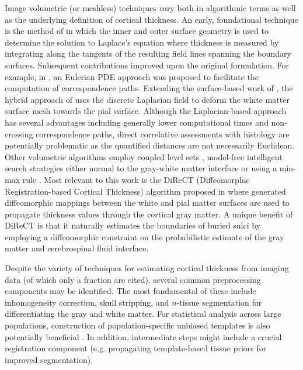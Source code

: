 Image volumetric (or meshless) techniques vary both in algorithmic terms as well as
the underlying definition of cortical thickness.  An early, foundational technique is the 
method of \cite{jones2000} in which the inner and outer surface geometry is used to determine the
solution to Laplace's equation where thickness is measured by integrating along the 
tangents of the resulting field lines spanning the boundary surfaces.  Subsequent contributions
improved upon the original formulation.  For example, in \cite{yezzi2003}, an Eulerian PDE approach
was proposed to facilitate the computation of correspondence paths.  Extending the surface-based
work of \cite{macdonald2000}, the hybrid approach of
\cite{kim2005} uses the discrete Laplacian field to deform the white matter surface mesh towards the 
pial surface.    Although the Laplacian-based approach has several advantages
including generally lower computational times and 
non-crossing correspondence paths, direct correlative assessments with histology
are potentially problematic as the quantified distances 
are not necessarily Euclidean.  Other volumetric algorithms employ coupled
level sets \citep{zeng1999}, model-free intelligent search strategies either normal to 
the gray-white matter interface \citep{scott2009} or using a min-max rule \citep{clement-vachet2011}.
Most relevant to this work is the DiReCT (Diffeomorphic Registration-based 
Cortical Thickness) algorithm proposed in \cite{das2009} where generated
diffeomorphic mappings between the 
white and pial matter surfaces are used to propagate thickness values 
through the cortical gray matter.  A unique benefit of DiReCT is that it
naturally estimates the boundaries of buried sulci by employing a
diffeomorphic constraint on the probabilistic estimate of the gray
matter and cerebrospinal fluid interface.  

Despite the variety of techniques for estimating cortical thickness
from imaging data (of which
only a fraction are cited), several common preprocessing components
may be identified.
The most fundamental of these include inhomogeneity correction, skull stripping, and $n$-tissue segmentation 
for differentiating the gray and white matter.  For statistical analysis 
across large populations, construction of population-specific unbiased templates
is also potentially beneficial \citep{evans2012}.
In addition, intermediate steps might include a crucial registration component (e.g. 
propagating template-based tissue priors for improved segmentation).

